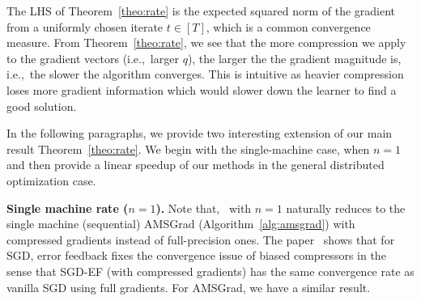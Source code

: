 \documentclass[11pt]{article}
\begin{document}
%

The LHS of Theorem~\ref{theo:rate} is the expected squared norm of the gradient from a uniformly chosen iterate $t\in [T]$, which is a common convergence measure. From Theorem~\ref{theo:rate}, we see that the more compression we apply to the gradient vectors (i.e.,~larger $q$), the larger the the gradient magnitude is, i.e.,~the slower the algorithm converges. This is intuitive as heavier compression loses more gradient information which would slower down the learner to find a good solution.

In the following paragraphs, we provide two interesting extension of our main result Theorem~\ref{theo:rate}. We begin with the single-machine case, when $n=1$ and then provide a linear speedup of our methods in the general distributed optimization case.

\textbf{Single machine rate ($n=1$).} Note that, \algo\ with $n=1$ naturally reduces to the single machine (sequential) AMSGrad (Algorithm~\ref{alg:amsgrad}) with compressed gradients instead of full-precision ones. The paper~\cite{karimireddy2019error} shows that for SGD, error feedback fixes the convergence issue of biased compressors in the sense that SGD-EF (with compressed gradients) has the same convergence rate as vanilla SGD using full gradients. For AMSGrad, we have a similar result.
\end{document}
